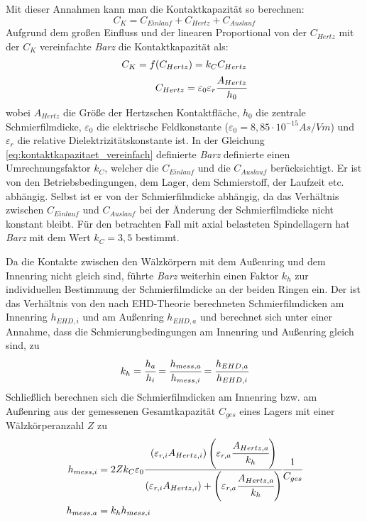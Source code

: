 Mit dieser Annahmen kann man die Kontaktkapazität so berechnen:
%
\begin{equation}
    C_K = C_{Einlauf} + C_{Hertz} + C_{Auslauf}
    \label{eq:kontaktkapazitaet}
\end{equation}
%
Aufgrund dem großen Einfluss und der linearen Proportional von der $C_{Hertz}$ mit der $C_K$ vereinfachte \textit{Barz} die Kontaktkapazität als:
%
\begin{align}
    C_K = f(C_{Hertz}) = k_C C_{Hertz} \\
    C_{Hertz} = \varepsilon_0 \varepsilon_r \cfrac{A_{Hertz}}{h_0}
    \label{eq:kontaktkapazitaet_vereinfach}
\end{align}
%
wobei $A_{Hertz}$ die Größe der Hertzschen Kontaktfläche, $h_0$ die zentrale Schmierfilmdicke, $\varepsilon_0$ die elektrische Feldkonstante ($\varepsilon_0 = 8,85 \cdot 10^{-15} As/Vm$) und $\varepsilon_r$ die relative Dielektrizitätskonstante ist.
In der Gleichung \ref{eq:kontaktkapazitaet_vereinfach} definierte \textit{Barz} definierte einen Umrechnungsfaktor $k_C$, welcher die $C_{Einlauf}$ und die $C_{Auslauf}$ berücksichtigt.
Er ist von den Betriebsbedingungen, dem Lager, dem Schmierstoff, der Laufzeit etc. abhängig.
Selbst ist er von der Schmierfilmdicke abhängig, da das Verhältnis zwischen $C_{Einlauf}$ und $C_{Auslauf}$ bei der Änderung der Schmierfilmdicke nicht konstant bleibt.
Für den betrachten Fall mit axial belasteten Spindellagern hat \textit{Barz} mit dem Wert $k_C = 3,5$ bestimmt.

Da die Kontakte zwischen den Wälzkörpern mit dem Außenring und dem Innenring nicht gleich sind, führte \textit{Barz} weiterhin einen Faktor $k_h$ zur individuellen Bestimmung der Schmierfilmdicke an der beiden Ringen ein.
Der ist das Verhältnis von den nach EHD-Theorie berechneten Schmierfilmdicken am Innenring $h_{EHD,i}$ und am Außenring $h_{EHD,a}$ und berechnet sich unter einer Annahme, dass die Schmierungbedingungen am Innenring und Außenring gleich sind, zu
%
\begin{equation}
    k_h = \cfrac{h_a}{h_i} = \cfrac{h_{mess,a}}{h_{mess,i}} = \cfrac{h_{EHD,a}}{h_{EHD,i}}
    \label{eq:kh_faktor}
\end{equation}
%
Schließlich berechnen sich die Schmierfilmdicken am Innenring bzw. am Außenring aus der gemessenen Gesamtkapazität $C_{ges}$ eines Lagers mit einer Wälzkörperanzahl $Z$ zu
%
\begin{align}
    h_{mess,i} &= 2 Z k_C \varepsilon_0 
                \cfrac{(\varepsilon_{r,i} A_{Hertz,i}) \left( \varepsilon_{r,a} \cfrac{A_{Hertz,a}}{k_h} \right) }
                      {(\varepsilon_{r,i} A_{Hertz,i}) + \left( \varepsilon_{r,a} \cfrac{A_{Hertz,a}}{k_h} \right) }
                \cfrac{1}{C_{ges}} \\
    h_{mess,a} &= k_h h_{mess,i}
\end{align}
%


